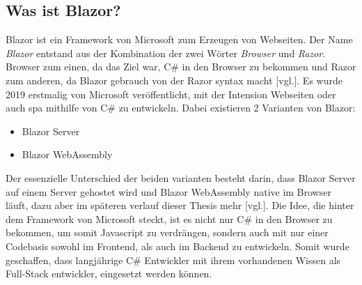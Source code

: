 \subsection{Was ist Blazor?}
\label{subsec:wasIstBlazor}
Blazor ist ein Framework von Microsoft zum Erzeugen von Webseiten. Der Name \emph{Blazor}
entstand aus der Kombination der zwei Wörter \emph{Browser} und \emph{Razor}. Browser zum einen,
da das Ziel war, C\# in den Browser zu bekommen und Razor zum anderen, da Blazor gebrauch von der
Razor syntax macht \cite{HierKommtBlazor}[vgl.]. Es wurde 2019 erstmalig von Microsoft
veröffentlicht, mit der Intension Webseiten oder auch \ac{spa} mithilfe von C\# zu entwickeln.
Dabei existieren 2 Varianten von Blazor:

\begin{itemize}
    \item Blazor Server
    \item Blazor WebAssembly
\end{itemize}
Der essenzielle Unterschied der beiden varianten besteht darin, dass Blazor Server auf einem
Server gehostet wird und Blazor WebAssembly native im Browser läuft, dazu aber im späteren
verlauf dieser Thesis mehr \cite{WasIstBlazor}[vgl.].
\newline
\newline
Die Idee, die hinter dem Framework von Microsoft steckt, ist es nicht nur C\# in den Browser zu
bekommen, um somit Javascript zu verdrängen, sondern auch mit nur einer Codebasis sowohl im
Frontend, als auch im Backend zu entwickeln. Somit wurde geschaffen, dass langjährige C\#
Entwickler mit ihrem vorhandenen Wissen als Full-Stack entwickler, eingesetzt werden können.
